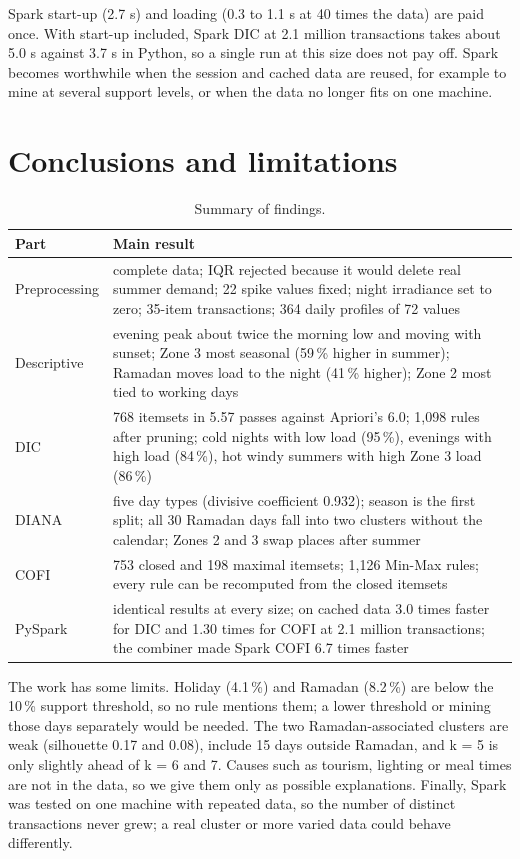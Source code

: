 \documentclass[11pt,a4paper]{article}
\begin{document}
Spark start-up (2.7 s) and loading (0.3 to 1.1 s at 40 times the data) are paid once. With start-up included, Spark
DIC at 2.1 million transactions takes about 5.0 s against 3.7 s in Python, so a single run at this size does not pay
off. Spark becomes worthwhile when the session and cached data are reused, for example to mine at several support
levels, or when the data no longer fits on one machine.

\section{Conclusions and limitations}
\begin{table}[H]\centering\small
\caption{Summary of findings.}
\begin{tabularx}{\textwidth}{@{}lY@{}}
\toprule
Part & Main result\\
\midrule
Preprocessing & complete data; IQR rejected because it would delete real summer demand; 22 spike values fixed; night irradiance set to zero; 35-item transactions; 364 daily profiles of 72 values\\
Descriptive & evening peak about twice the morning low and moving with sunset; Zone 3 most seasonal (59\,\% higher in summer); Ramadan moves load to the night (41\,\% higher); Zone 2 most tied to working days\\
DIC & 768 itemsets in 5.57 passes against Apriori's 6.0; 1,098 rules after pruning; cold nights with low load (95\,\%), evenings with high load (84\,\%), hot windy summers with high Zone 3 load (86\,\%)\\
DIANA & five day types (divisive coefficient 0.932); season is the first split; all 30 Ramadan days fall into two clusters without the calendar; Zones 2 and 3 swap places after summer\\
COFI & 753 closed and 198 maximal itemsets; 1,126 Min-Max rules; every rule can be recomputed from the closed itemsets\\
PySpark & identical results at every size; on cached data 3.0 times faster for DIC and 1.30 times for COFI at 2.1 million transactions; the combiner made Spark COFI 6.7 times faster\\
\bottomrule
\end{tabularx}
\end{table}

The work has some limits. Holiday (4.1\,\%) and Ramadan (8.2\,\%) are below the 10\,\% support threshold, so no
rule mentions them; a lower threshold or mining those days separately would be needed. The two Ramadan-associated
clusters are weak (silhouette 0.17 and 0.08), include 15 days outside Ramadan, and k = 5 is only slightly ahead of
k = 6 and 7. Causes such as tourism, lighting or meal times are not in the data, so we give them only as possible
explanations. Finally, Spark was tested on one machine with repeated data, so the number of distinct transactions
never grew; a real cluster or more varied data could behave differently.
\end{document}
